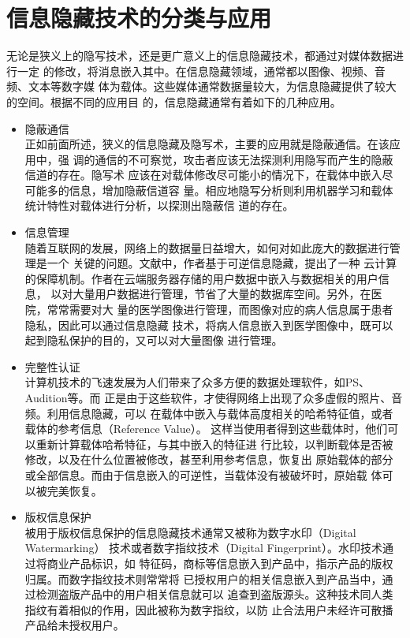 \section{信息隐藏技术的分类与应用}
\label{s:type_application_data_hiding}
无论是狭义上的隐写技术，还是更广意义上的信息隐藏技术，都通过对媒体数据进行一定
的修改，将消息嵌入其中。在信息隐藏领域，通常都以图像、视频、音频、文本等数字媒
体为载体。这些媒体通常数据量较大，为信息隐藏提供了较大的空间。根据不同的应用目
的，信息隐藏通常有着如下的几种应用。
\par
\begin{itemize}
  \item 隐蔽通信\\
  正如前面所述，狭义的信息隐藏及隐写术，主要的应用就是隐蔽通信。在该应用中，强
  调的通信的不可察觉，攻击者应该无法探测利用隐写而产生的隐蔽信道的存在。隐写术
  应该在对载体修改尽可能小的情况下，在载体中嵌入尽可能多的信息，增加隐蔽信道容
  量。相应地隐写分析则利用机器学习和载体统计特性对载体进行分析，以探测出隐蔽信
  道的存在。
  \par
  \item 信息管理\\
  随着互联网的发展，网络上的数据量日益增大，如何对如此庞大的数据进行管理是一个
  关键的问题。文献\cite{hwang2010trusted}中，作者基于可逆信息隐藏，提出了一种
  云计算的保障机制。作者在云端服务器存储的用户数据中嵌入与数据相关的用户信息，
  以对大量用户数据进行管理，节省了大量的数据库空间。另外，在医院，常常需要对大
  量的医学图像进行管理，而图像对应的病人信息属于患者隐私，因此可以通过信息隐藏
  技术，将病人信息嵌入到医学图像中，既可以起到隐私保护的目的，又可以对大量图像
  进行管理。
  \par
  \item 完整性认证\\
  计算机技术的飞速发展为人们带来了众多方便的数据处理软件，如PS、Audition等。而
  正是由于这些软件，才使得网络上出现了众多虚假的照片、音频。利用信息隐藏，可以
  在载体中嵌入与载体高度相关的哈希特征值，或者载体的参考信息（Reference Value）。
  这样当使用者得到这些载体时，他们可以重新计算载体哈希特征，与其中嵌入的特征进
  行比较，以判断载体是否被修改，以及在什么位置被修改，甚至利用参考信息，恢复出
  原始载体的部分或全部信息。而由于信息嵌入的可逆性，当载体没有被破坏时，原始载
  体可以被完美恢复。
  \par
  \item 版权信息保护\\
  被用于版权信息保护的信息隐藏技术通常又被称为数字水印（Digital Watermarking）
  技术或者数字指纹技术（Digital Fingerprint）。水印技术通过将商业产品标识，如
  特征码，商标等信息嵌入到产品中，指示产品的版权归属。而数字指纹技术则常常将
  已授权用户的相关信息嵌入到产品当中，通过检测盗版产品中的用户相关信息就可以
  追查到盗版源头。这种技术同人类指纹有着相似的作用，因此被称为数字指纹，以防
  止合法用户未经许可散播产品给未授权用户。
  \par
\end{itemize}



